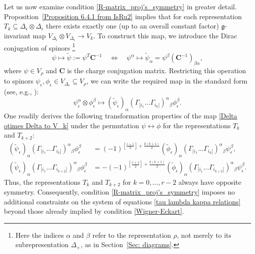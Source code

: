 \documentclass[a4paper]{article}
\renewcommand{\=}{\ =\ }
\numberwithin{equation}{section}
\theoremstyle{remark}
\begin{document}
Let us now examine condition \eqref{R-matrix_proj's_symmetry} in greater detail.
Proposition~\ref{Proposition 6.4.1 from IsRu2} implies that for each representation
$T_k\subseteq \Delta_\epsilon\otimes \Delta_\epsilon$ there exists exactly one
(up to an overall constant factor) $\mathfrak{g}$-invariant map
$V_{\Delta_\epsilon}\otimes V_{\Delta_\epsilon}\to V_k$.
To construct this map, we introduce the Dirac conjugation of spinors%
\footnote{Here the indices $\alpha$ and $\beta$ refer to the representation $\rho$, not merely to its subrepresentation $\Delta_+$, as in Section~\ref{Sec: diagrams}.}
\begin{equation}
\psi\mapsto \widetilde{\psi}:=\psi^T \mathbf{C}^{-1}
\quad \iff\quad
\psi^\alpha\mapsto \widetilde{\psi}_\alpha
=\psi^\beta (\mathbf{C}^{-1})_{\beta\alpha},
\end{equation}
where $\psi\in V_\rho$ and $\mathbf{C}$ is the charge conjugation matrix.
Restricting this operation to spinors
$\psi_\epsilon,\phi_\epsilon\in V_{\Delta_\epsilon}\subseteq V_\rho$,
we can write the required map in the standard form (see, e.g., \cite{IsRu2}):
\begin{equation}\label{Delta otimes Delta to V_k}
\psi_\epsilon^\alpha\otimes \phi_\epsilon^\beta
\longmapsto
(\widetilde{\psi}_\epsilon)_\alpha
(\Gamma_{[i_1}\dots \Gamma_{i_k]})^\alpha{}_{\beta}
\phi_\epsilon^\beta.
\end{equation}
One readily derives the following transformation properties of the map
\eqref{Delta otimes Delta to V_k} under the permutation
$\psi\leftrightarrow \phi$ for the representations $T_k$ and $T_{k+2}$:
\begin{equation}\label{Projectors symmetries}
\begin{aligned}
(\widetilde{\psi}_\epsilon)_\alpha
(\Gamma_{[i_1}\dots \Gamma_{i_k]})^\alpha{}_{\beta}
\phi_\epsilon^\beta
&=(-1)^{[\frac{r+1}{2}]+\frac{k(k+1)}{2}}
(\widetilde{\phi}_\epsilon)_\alpha
(\Gamma_{[i_1}\dots \Gamma_{i_k]})^\alpha{}_{\beta}
\psi_\epsilon^\beta,\\
(\widetilde{\psi}_\epsilon)_\alpha
(\Gamma_{[i_1}\dots \Gamma_{i_{k+2}]})^\alpha{}_{\beta}
\phi_\epsilon^\beta
&=-(-1)^{[\frac{r+1}{2}]+\frac{k(k+1)}{2}}
(\widetilde{\phi}_\epsilon)_\alpha
(\Gamma_{[i_1}\dots \Gamma_{i_{k+2}]})^\alpha{}_{\beta}
\psi_\epsilon^\beta.
\end{aligned}
\end{equation}
Thus, the representations $T_k$ and $T_{k+2}$ for $k=0,\dots,r-2$ always have opposite symmetry.
Consequently, condition \eqref{R-matrix_proj's_symmetry} imposes no additional constraints on the system of equations \eqref{tau lambda kappa relations} beyond those already implied by condition \eqref{Wigner-Eckart}.
\end{document}
